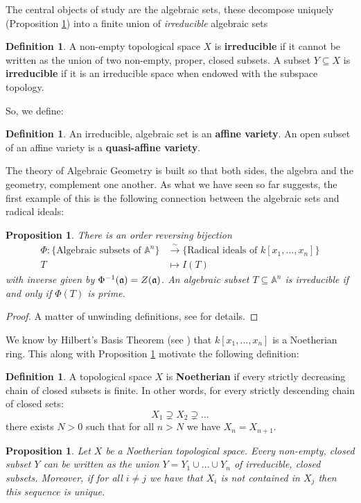 \documentclass[12pt]{article}
\theoremstyle{plain}
\newtheorem{proposition}[thm]{Proposition}
\theoremstyle{definition}
\newtheorem{defn}[thm]{Definition} %
\newcommand{\bb}[1]{\mathbb{#1}}
\newcommand{\lto}{\longrightarrow}
\begin{document}
The central objects of study are the algebraic sets, these decompose uniquely (Proposition \ref{prop:decomposition}) into a finite union of \emph{irreducible} algebraic sets
\begin{defn}
A non-empty topological space $X$ is \textbf{irreducible} if it cannot be written as the union of two non-empty, proper, closed subsets. A subset $Y \subseteq X$ is \textbf{irreducible} if it is an irreducible space when endowed with the subspace topology.
\end{defn}
So, we define:
\begin{defn}
An irreducible, algebraic set is an \textbf{affine variety}. An open subset of an affine variety is a \textbf{quasi-affine variety}.
\end{defn}
The theory of Algebraic Geometry is built so that both sides, the algebra and the geometry, complement one another. As what we have seen so far suggests, the first example of this is the following connection between the algebraic sets and radical ideals:
\begin{proposition}\label{prop:alg_rad}
There is an order reversing bijection
\begin{align}
    \Phi: \lbrace \text{Algebraic subsets of }\bb{A}^n\rbrace &\stackrel{\sim}{\lto}\lbrace \text{Radical ideals of }k[x_1,...,x_n]\rbrace\\
    T &\longmapsto I(T)
\end{align}
with inverse given by $\Phi^{-1}(\frak{a}) = Z(\frak{a})$. An algebraic subset $T \subseteq \bb{A}^n$ is irreducible if and only if $\Phi(T)$ is prime.
\end{proposition}
\begin{proof}
A matter of unwinding definitions, see \cite[\S I 1.4]{hartshorne} for details.
\end{proof}
We know by Hilbert's Basis Theorem (see \cite{algebra}) that $k[x_1,...,x_n]$ is a Noetherian ring. This along with Proposition \ref{prop:alg_rad} motivate the following definition:
\begin{defn}
A topological space $X$ is \textbf{Noetherian} if every strictly decreasing chain of closed subsets is finite. In other words, for every strictly descending chain of closed sets:
\begin{equation}
    X_1 \supsetneq X_2 \supsetneq \hdots
\end{equation}
there exists $N > 0$ such that for all $n > N$ we have $X_n = X_{n+1}$.
\end{defn}
\begin{proposition}\label{prop:decomposition}
Let $X$ be a Noetherian topological space. Every non-empty, closed subset $Y$ can be written as the union $Y = Y_1 \cup \hdots \cup Y_n$ of irreducible, closed subsets. Moreover, if for all $i \neq j$ we have that $X_i$ is not contained in $X_j$ then this sequence is unique.
\end{proposition}
\end{document}
